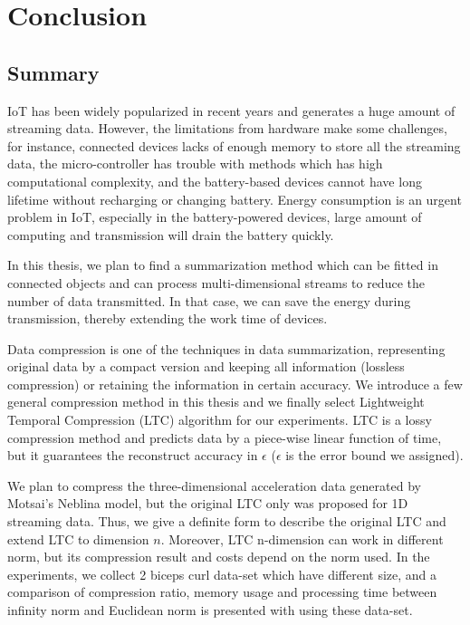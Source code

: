 \chapter{Conclusion}


\section{Summary}


IoT has been widely popularized in recent years and generates a huge amount of
streaming data. However, the limitations from hardware make some challenges, for
instance, connected devices lacks of enough memory to store all the streaming
data, the micro-controller has trouble with methods which has high computational
complexity, and the battery-based devices cannot have long lifetime without
recharging or changing battery. Energy consumption is an urgent problem in IoT,
especially in the battery-powered devices, large amount of computing and
transmission will drain the battery quickly.

In this thesis, we plan to find a summarization method which can be fitted in
connected objects and can process multi-dimensional streams to reduce the number
of data transmitted. In that case, we can save the energy during transmission,
thereby extending the work time of devices.

Data compression is one of the techniques in data summarization, representing
original data by a compact version and keeping all information (lossless
compression) or retaining the information in certain accuracy. We introduce a
few general compression method in this thesis and we finally select Lightweight
Temporal Compression (LTC) algorithm for our experiments. LTC is a lossy
compression method and predicts data by a piece-wise linear function of time,
but it guarantees the reconstruct accuracy in $\epsilon$ ($\epsilon$ is the
error bound we assigned). 

We plan to compress the three-dimensional acceleration data generated by
Motsai's Neblina model, but the original LTC only was proposed for 1D streaming
data. Thus, we give a definite form to describe the original LTC and extend LTC
to dimension $n$. Moreover, LTC n-dimension can work in different norm, but its
compression result and costs depend on the norm used. In the experiments, we
collect 2 biceps curl data-set which have different size, and a comparison of
compression ratio, memory usage and processing time between infinity norm and
Euclidean norm is presented with using these data-set.


